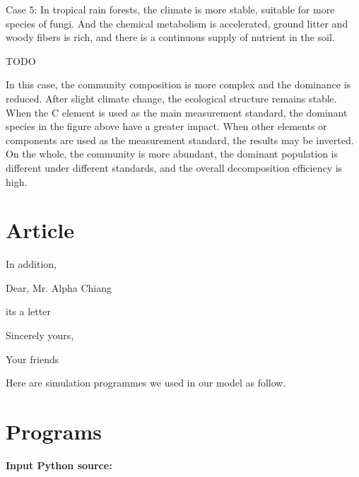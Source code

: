 \documentclass{mcmthesis}
\begin{document}
Case 5: In tropical rain forests, the climate is more stable, suitable for more species of fungi. And the chemical metabolism is accelerated, ground litter and woody fibers is rich, and there is a continuous supply of nutrient in the soil.

TODO

In this case, the community composition is more complex and the dominance is reduced. After slight climate change, the ecological structure remains stable. When the C element is used as the main measurement standard, the dominant species in the figure above have a greater impact. When other elements or components are used as the measurement standard, the results may be inverted. On the whole, the community is more abundant, the dominant population is different under different standards, and the overall decomposition efficiency is high.






























{}


\begin{appendices}

\section{Article}

In addition, 

\begin{letter}{Dear, Mr. Alpha Chiang}

its a letter

\vspace{\parskip}

Sincerely yours,

Your friends

\end{letter}
Here are simulation programmes we used in our model as follow.\\





\section{Programs}
\textbf{\textcolor[rgb]{0.98,0.00,0.00}{Input Python source:}}

\end{appendices}
\end{document}
